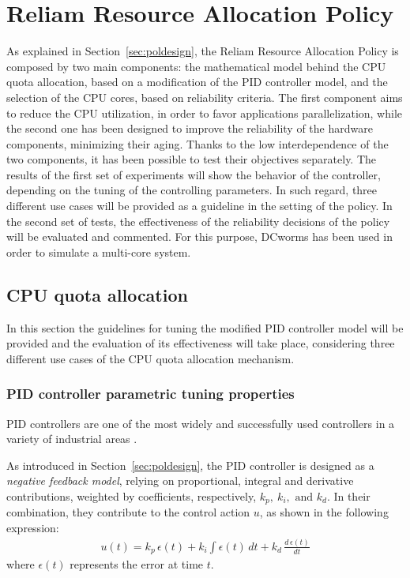 \section{Reliam Resource Allocation Policy}
As explained in Section~\ref{sec:poldesign}, the Reliam Resource Allocation Policy is composed by two main components: the mathematical model behind the CPU quota allocation, based on a modification of the PID controller model, and the selection of the CPU cores, based on reliability criteria. The first component aims to reduce the CPU utilization, in order to favor applications parallelization, while the second one has been designed to improve the reliability of the hardware components, minimizing their aging. Thanks to the low interdependence of the two components, it has been possible to test their objectives separately. The results of the first set of experiments will show the behavior of the controller, depending on the tuning of the controlling parameters. In such regard, three different use cases will be provided as a guideline in the setting of the policy. In the second set of tests, the effectiveness of the reliability decisions of the policy will be evaluated and commented. For this purpose, DCworms has been used in order to simulate a multi-core system.

\subsection{CPU quota allocation}
In this section the guidelines for tuning the modified PID controller model will be provided and the evaluation of its effectiveness  will take place, considering three different use cases of the CPU quota allocation mechanism.

\subsubsection{PID controller parametric tuning properties}
PID controllers are one of the most widely and successfully used controllers in a variety of industrial areas \cite{1638134}.

As introduced in Section~\ref{sec:poldesign}, the PID controller is designed as a \emph{negative feedback model}, relying on proportional, integral and derivative contributions, weighted by coefficients, respectively, $k_p,\ k_i, \text{ and } k_d$. In their combination, they contribute to the control action $u$, as shown in the following expression:
\begin{align*}
u(t) = k_p\,\epsilon(t) + k_i\int\epsilon(t)\,dt + k_d\,\frac{d\,\epsilon(t)}{dt}    
\end{align*}
where $\epsilon(t)$ represents the error at time $t$.

